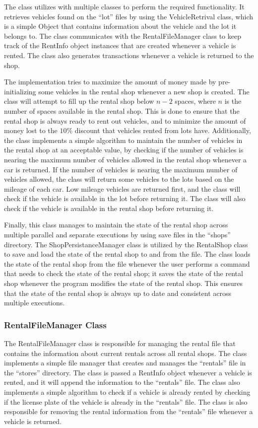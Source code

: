 \documentclass[conference]{IEEEtran}
\begin{document}
The class utilizes with multiple classes to perform the required functionality. It retrieves vehicles found on the ``lot'' files by using the VehicleRetrival class, which is a simple Object that contains information about the vehicle and the lot it belongs to. The class communicates with the RentalFileManager class to keep track of the RentInfo object instances that are created whenever a vehicle is rented. The class also generates transactions whenever a vehicle is returned to the shop. 

The implementation tries to maximize the amount of money made by pre-initializing some vehicles in the rental shop whenever a new shop is created. The class will attempt to fill up the rental shop below $n-2$ spaces, where $n$ is the number of spaces available in the rental shop. This is done to ensure that the rental shop is always ready to rent out vehicles, and to minimize the amount of money lost to the $10\%$ discount that vehicles rented from lots have. 
Additionally, the class implements a simple algorithm to maintain the number of vehicles in the rental shop at an acceptable value, by checking if the number of vehicles is nearing the maximum number of vehicles allowed in the rental shop whenever a car is returned. If the number of vehicles is nearing the maximum number of vehicles allowed, the class will return some vehicles to the lots based on the mileage of each car. Low mileage vehicles are returned first, and the class will check if the vehicle is available in the lot before returning it. The class will also check if the vehicle is available in the rental shop before returning it.

Finally, this class manages to maintain the state of the rental shop across multiple parallel and separate executions by using save files in the ``shops'' directory. The ShopPersistanceManager class is utilized by the RentalShop class to save and load the state of the rental shop to and from the file. The class loads the state of the rental shop from the file whenever the user performs a command that needs to check the state of the rental shop; it saves the state of the rental shop whenever the program modifies the state of the rental shop. This ensures that the state of the rental shop is always up to date and consistent across multiple executions.

\subsubsection{RentalFileManager Class}
The RentalFileManager class is responsible for managing the rental file that contains the information about current rentals across all rental shops. The class implements a simple file manager that creates and manages the ``rentals'' file in the ``stores'' directory. The class is passed a RentInfo object whenever a vehicle is rented, and it will append the information to the ``rentals'' file. The class also implements a simple algorithm to check if a vehicle is already rented by checking if the license plate of the vehicle is already in the ``rentals'' file. The class is also responsible for removing the rental information from the ``rentals'' file whenever a vehicle is returned. 
\end{document}
